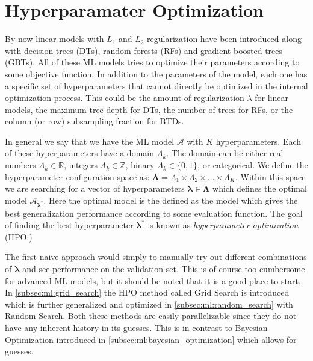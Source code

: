 \section{Hyperparamater Optimization}
\label{sec:ml:hyperparameter_optimization}
By now linear models with $L_1$ and $L_2$ regularization have been introduced along with decision trees (DTs), random forests (RFs) and gradient boosted trees (GBTs). All of these ML models tries to optimize their parameters according to some objective function. In addition to the parameters of the model, each one has a specific set of hyperparameters that cannot directly be optimized in the internal optimization process. This could be the amount of regularization $\lambda$ for linear models, the maximum tree depth for DTs, the number of trees for RFs, or the column (or row) subsampling fraction for BTDs. 

In general we say that we have the ML model $\mathcal{A}$ with $K$ hyperparameters. Each of these hyperparameters have a domain $\Lambda_k$. The domain can be either real numbers $\Lambda_k \in \mathbb{R}$, integers $\Lambda_k \in \mathbb{Z}$, binary $\Lambda_k \in \{0, 1\}$, or categorical. We define the hyperparameter configuration space as: $\bm{\Lambda} = \Lambda_1 \times \Lambda_2 \times \dots \times \Lambda_K$. Within this space we are searching for a vector of hyperparameters $\bm{\lambda} \in \bm{\Lambda}$ which defines the optimal model $\mathcal{A}_{\bm{\lambda}^*}$. Here the optimal model is the defined as the model which gives the best generalization performance according to some evaluation function. The goal of finding the best hyperparameter $\bm{\lambda^*}$ is known as \emph{hyperparameter optimization} (HPO.)

The first naive approach would simply to manually try out different combinations of $\bm{\lambda}$ and see performance on the validation set. This is of course too cumbersome for advanced ML models, but it should be noted that it is a good place to start. In \autoref{subsec:ml:grid_search} the HPO method called Grid Search is introduced which is further generalized and optimized in \autoref{subsec:ml:random_search} with Random Search. Both these methods are easily parallelizable since they do not have any inherent history in its guesses. This is in contrast to Bayesian Optimization introduced in \autoref{subsec:ml:bayesian_optimization} which allows for  guesses.

